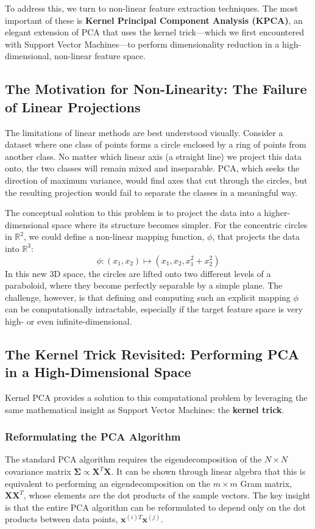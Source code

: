 \begin{enumerate}
To address this, we turn to non-linear feature extraction techniques. The most important of these is \textbf{Kernel Principal Component Analysis (KPCA)}, an elegant extension of PCA that uses the kernel trick—which we first encountered with Support Vector Machines—to perform dimensionality reduction in a high-dimensional, non-linear feature space.

\subsection{The Motivation for Non-Linearity: The Failure of Linear Projections}
\label{subsec:kpca_motivation}
The limitations of linear methods are best understood visually. Consider a dataset where one class of points forms a circle enclosed by a ring of points from another class. No matter which linear axis (a straight line) we project this data onto, the two classes will remain mixed and inseparable. PCA, which seeks the direction of maximum variance, would find axes that cut through the circles, but the resulting projection would fail to separate the classes in a meaningful way.

The conceptual solution to this problem is to project the data into a higher-dimensional space where its structure becomes simpler. For the concentric circles in $\mathbb{R}^2$, we could define a non-linear mapping function, $\phi$, that projects the data into $\mathbb{R}^3$:
$$ \phi: (x_1, x_2) \mapsto (x_1, x_2, x_1^2 + x_2^2) $$
In this new 3D space, the circles are lifted onto two different levels of a paraboloid, where they become perfectly separable by a simple plane. The challenge, however, is that defining and computing such an explicit mapping $\phi$ can be computationally intractable, especially if the target feature space is very high- or even infinite-dimensional.

\subsection{The Kernel Trick Revisited: Performing PCA in a High-Dimensional Space}
\label{subsec:kpca_kernel_trick}
Kernel PCA provides a solution to this computational problem by leveraging the same mathematical insight as Support Vector Machines: the \textbf{kernel trick}.

\subsubsection*{Reformulating the PCA Algorithm}
The standard PCA algorithm requires the eigendecomposition of the $N \times N$ covariance matrix $\mathbf{\Sigma} \propto \mathbf{X}^T \mathbf{X}$. It can be shown through linear algebra that this is equivalent to performing an eigendecomposition on the $m \times m$ Gram matrix, $\mathbf{X}\mathbf{X}^T$, whose elements are the dot products of the sample vectors. The key insight is that the entire PCA algorithm can be reformulated to depend only on the dot products between data points, $\mathbf{x}^{(i)T} \mathbf{x}^{(j)}$.


\end{enumerate}

